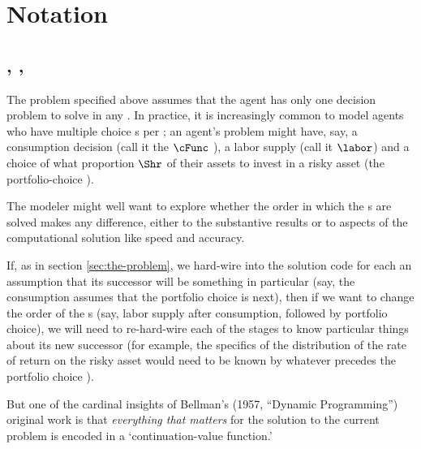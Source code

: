 
\hypertarget{notation}{}
\section{Notation}\label{sec:notation}

\subsection{\Intervals, \Stgs, \Moves}

The problem specified above assumes that the agent has only one decision problem to solve in any {\interval}.  In practice, it is increasingly common to model agents who have multiple choice {\stg}s per {\interval}; an agent's problem might have, say, a consumption decision (call it the $\cFunc$ {\stg}), a labor supply {\stg} (call it $\labor$) and a choice of what proportion $\Shr$ of their assets to invest in a risky asset (the portfolio-choice {\stg}).

The modeler might well want to explore whether the order in which the {\stg}s are solved makes any difference, either to the substantive results or to aspects of the computational solution like speed and accuracy.

If, as in section \ref{sec:the-problem}, we hard-wire into the solution code for each {\stg} an assumption that its successor {\stg} will be something in particular (say, the consumption {\stg} assumes that the portfolio choice is next), then if we want to change the order of the {\stg}s (say, labor supply after consumption, followed by portfolio choice), we will need to re-hard-wire each of the stages to know particular things about its new successor (for example, the specifics of the distribution of the rate of return on the risky asset would need to be known by whatever {\stg} precedes the portfolio choice {\stg}).

But one of the cardinal insights of Bellman's (1957, ``Dynamic Programming'') original work is that \emph{everything that matters} for the solution to the current problem is encoded in a `continuation-value function.' %

